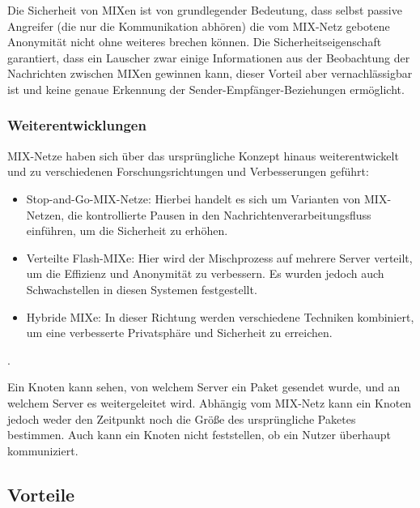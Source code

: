 Die Sicherheit von MIXen ist von grundlegender Bedeutung, dass selbst passive Angreifer (die nur die Kommunikation abhören) die vom MIX-Netz gebotene Anonymität nicht ohne weiteres brechen können. Die Sicherheitseigenschaft garantiert, dass ein Lauscher zwar einige Informationen aus der Beobachtung der Nachrichten zwischen MIXen gewinnen kann, dieser Vorteil aber vernachlässigbar ist und keine genaue Erkennung der Sender-Empfänger-Beziehungen ermöglicht.

\subsubsection{Weiterentwicklungen}

MIX-Netze haben sich über das ursprüngliche Konzept hinaus weiterentwickelt und zu verschiedenen Forschungsrichtungen und Verbesserungen geführt:

\begin{itemize}

\item Stop-and-Go-MIX-Netze: Hierbei handelt es sich um Varianten von MIX-Netzen, die kontrollierte Pausen in den Nachrichtenverarbeitungsfluss einführen, um die Sicherheit zu erhöhen.

\item Verteilte \glqq Flash-MIXe\grqq: Hier wird der Mischprozess auf mehrere Server verteilt, um die Effizienz und Anonymität zu verbessern. Es wurden jedoch auch Schwachstellen in diesen Systemen festgestellt.

\item Hybride MIXe: In dieser Richtung werden verschiedene Techniken kombiniert, um eine verbesserte Privatsphäre und Sicherheit zu erreichen\footnotemark{}.

\end{itemize}.

Ein Knoten kann sehen, von welchem Server ein Paket gesendet wurde, und an welchem Server es weitergeleitet wird. Abhängig vom MIX-Netz kann ein Knoten jedoch weder den Zeitpunkt noch die Größe des ursprüngliche Paketes bestimmen. Auch kann ein Knoten nicht feststellen, ob ein Nutzer überhaupt kommuniziert.

\subsection{Vorteile}

